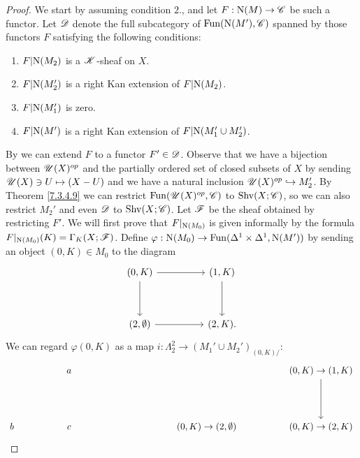 \documentclass[../../thesis.tex]{subfiles}
\begin{document}
\begin{proof}
    We start by assuming condition $2.$, and let $F: \mathrm{N}(M) \to \mathscr{C}$ be such a functor.
    Let $\mathscr{D}$ denote the full subcategory of $\mathrm{Fun}(\mathrm{N}(M'), \mathscr{C})$ spanned by those functors $F$ satisfying the following conditions:
    \begin{enumerate}
        \item $F|\mathrm{N}(M_2)$ is a $\mathscr{K}$-sheaf on $X$.
        \item $F|\mathrm{N}(M'_2)$ is a right Kan extension of $F|\mathrm{N}(M_2)$.
        \item $F|\mathrm{N}(M'_1)$ is zero.
        \item $F|\mathrm{N}(M')$ is a right Kan extension of $F|\mathrm{N}(M'_1 \cup M'_2)$.
    \end{enumerate}
    By \cite[Proposition 4.3.2.15]{HTT} we can extend $F$ to a functor $F' \in \mathscr{D}$.
    Observe that we have a bijection between $\mathscr{U}(X)^{op}$ and the partially ordered set of closed subsets of $X$ by sending $\mathscr{U}(X) \ni U \mapsto (X - U)$ and we have a natural inclusion $\mathscr{U}(X)^{op} \hookrightarrow M_2'$.
    By Theorem \ref{7.3.4.9} we can restrict $\mathrm{Fun}(\mathscr{U}(X)^{op}, \mathscr{C})$ to $\mathrm{Shv}(X;\mathscr{C})$, so we can also restrict $M_2'$ and even $\mathscr{D}$ to $\mathrm{Shv}(X;\mathscr{C})$.
    Let $\mathscr{F}$ be the sheaf obtained by restricting $F'$. We will first prove that $F|_{\mathrm{N}(M_0)}$ is given informally by the formula $F|_{\mathrm{N}(M_0)}(K)=\Gamma_K(X;\mathscr{F})$.
    Define $\varphi:\mathrm{N}(M_0) \to \mathrm{Fun}(\Delta^1\times \Delta^1, \mathrm{N}(M'))$ by sending an object $(0,K) \in M_0$ to the diagram
    \[\begin{tikzcd}
            {(0,K)} && {(1,K)} \\
            \\
            {(2,\emptyset)} && {(2,K)}
            \arrow[from=1-1, to=1-3]
            \arrow[from=1-3, to=3-3]
            \arrow[from=3-1, to=3-3]
            \arrow[from=1-1, to=3-1].
        \end{tikzcd}\]
    We can regard $\varphi(0,K)$ as a map $i: \Lambda_2^2 \to (M_1'\cup M_2')_{(0,K)/}$:
    \[\begin{tikzcd}
            && a &&&&&& {(0,K)\to(1,K)} \\
            &&& {} &&& {} \\
            b && c &&&& {(0,K)\to(2,\emptyset)} && {(0,K)\to(2,K)}
            \arrow[from=1-9, to=3-9]

\end{tikzcd}\]
\end{proof}
\end{document}
